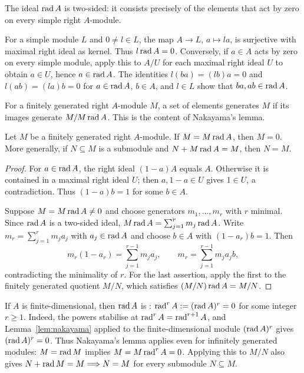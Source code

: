 The ideal $\operatorname{rad}\nolimits A$ is two-sided: it consists precisely of the elements that act by zero on every simple right $A$-module.

\begin{supplementary}
For a simple module $L$ and $0\neq l\in L$, the map $A\to L$, $a\mapsto la$, is surjective with maximal right ideal as kernel.
Thus $l\operatorname{rad}\nolimits A=0$.
Conversely, if $a\in A$ acts by zero on every simple module, apply this to $A/U$ for each maximal right ideal $U$ to obtain $a\in U$, hence $a\in \operatorname{rad}\nolimits A$.
The identities $l(ba)=(lb)a=0$ and $l(ab)=(la)b=0$ for $a\in \operatorname{rad}\nolimits A$, $b\in A$, and $l\in L$ show that $ba,ab\in \operatorname{rad}\nolimits A$.
\end{supplementary}

For a finitely generated right $A$-module $M$, a set of elements generates $M$ if its images generate $M/M\operatorname{rad}\nolimits A$.
This is the content of Nakayama's lemma.

\begin{lemma}\label{lem:nakayama}
Let $M$ be a finitely generated right $A$-module.
If $M=M\operatorname{rad}\nolimits A$, then $M=0$.
More generally, if $N\subseteq M$ is a submodule and $N+M\operatorname{rad}\nolimits A=M$, then $N=M$.
\end{lemma}

\begin{supplementary}
\begin{proof}
For $a\in \operatorname{rad}\nolimits A$, the right ideal $(1-a)A$ equals $A$.
Otherwise it is contained in a maximal right ideal $U$; then $a,1-a\in U$ gives $1\in U$, a contradiction.
Thus $(1-a)b=1$ for some $b\in A$.

Suppose $M=M\operatorname{rad}\nolimits A\neq0$ and choose generators $m_1,\ldots,m_r$ with $r$ minimal.
Since $\operatorname{rad}\nolimits A$ is a two-sided ideal, $M\operatorname{rad}\nolimits A=\sum_{j=1}^r m_j\operatorname{rad}\nolimits A$.
Write $m_r=\sum_{j=1}^r m_j a_j$ with $a_j\in \operatorname{rad}\nolimits A$ and choose $b\in A$ with $(1-a_r)b=1$.
Then
\[
m_r(1-a_r)=\sum_{j=1}^{r-1}m_j a_j,
\qquad
m_r=\sum_{j=1}^{r-1}m_j a_j b,
\]
contradicting the minimality of $r$.
For the last assertion, apply the first to the finitely generated quotient $M/N$, which satisfies $(M/N)\operatorname{rad}\nolimits A=M/N$.
\end{proof}
\end{supplementary}

\begin{remark}\label{rem:nakayama-finite-dimensional}
If $A$ is finite-dimensional, then $\operatorname{rad}\nolimits A$ is : $\operatorname{rad}\nolimits^r A := (\operatorname{rad}\nolimits A)^r=0$ for some integer $r\geq1$.
Indeed, the powers stabilise at $\operatorname{rad}\nolimits^r A=\operatorname{rad}\nolimits^{r+1} A$, and Lemma~\ref{lem:nakayama} applied to the finite-dimensional module $(\operatorname{rad}\nolimits A)^r$ gives $(\operatorname{rad}\nolimits A)^r=0$.
Thus Nakayama's lemma applies even for infinitely generated modules: $M=\operatorname{rad}\nolimits M$ implies $M=M\operatorname{rad}\nolimits^r A=0$.
Applying this to $M/N$ also gives $N+\operatorname{rad}\nolimits M=M\Longrightarrow N=M$ for every submodule $N\subseteq M$.
\end{remark}

